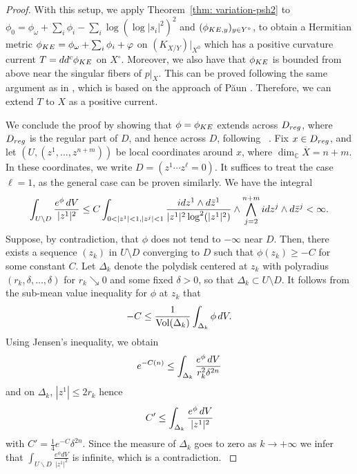 \documentclass[a4paper, 11pt]{amsart}
\theoremstyle{plain}
\numberwithin{equation}{section} %
\numberwithin{figure}{section} %
\theoremstyle{plain}
\theoremstyle{plain}
\theoremstyle{plain}
\theoremstyle{plain}
\theoremstyle{remark}
\theoremstyle{definition}
\theoremstyle{definition}
\DeclareMathOperator \Vol {{\rm Vol}}
\begin{document}
\begin{proof}
{With this setup, we apply Theorem~\ref{thm: variation-psh2}  to $\phi_0= \phi_\omega+\sum_i \phi_i  -\sum_i\log(\log|s_i|^2)^2$  and $(\phi_{{\rm KE}, y})_{y\in Y^\circ }$, to obtain a Hermitian metric $ \phi_{\rm KE}=\phi_\omega+\sum_i\phi_i+ \varphi$ on $(K_{X/Y})|_{X^0}$ which has a positive curvature current  $T=dd^c\phi_{\rm KE}$ on $X^\circ$. }
Moreover, we also have that $\phi_{{\rm KE}}$ is bounded from above near the singular fibers of $p|_X$.  This can be proved following the same argument as in \cite[Section 6]{Guenancia_2020}, which is based on the approach of P\u aun \cite[\S 3.3]{paun17-relative-nef}.  
 Therefore, we can extend $T$ to $X$ as a positive current. 
 
 {We conclude the proof by showing that $\phi = \phi_{\rm KE}$ extends across $D_{\rm reg}$, {where $D_{\rm reg}$ is the regular part of $D$}, and hence across $D$, following ~\cite[Lemma 3.7]{Berman-Guenancia14-logcanonical}. Fix $x \in D_{\rm reg}$, and let $(U, (z^1, \ldots, z^{n+m}))$ be local coordinates around $x$, where $\dim_{\mathbb{C}} \overline{X}=n+m$. In these coordinates, we write $D = (z^1 \cdots z^\ell = 0)$. It suffices to treat the case $\ell = 1$, as the general case can be proven similarly. We have the integral 
 \[\int_{U\backslash D}\frac{e^\phi \, {\rm d}V}{|z^1|^2} \leq C\int_{0<|z^1| < 1, |z^j|<1 }\frac{i{\rm d}z^1\wedge {\rm d}\bar z^1}{|z^1|^2\log^2 (|z^1|^2)}\wedge\bigwedge_{j=2}^{n+m} i{\rm d}
 z^j\wedge {\rm d}\Bar{z}^j< \infty.  \]  Suppose, by contradiction, that $\phi$ does not tend to $-\infty$ near $D$. Then, there exists a sequence $(z_k)$ in $U \setminus D$ converging to $D$ such that $\phi(z_k) \geq -C$ for some constant $C$. Let $\Delta_k$ denote the polydisk centered at $z_k$ with polyradius $(r_k, \delta, \ldots, \delta)$ for $r_k \searrow 0$ and some fixed $\delta > 0$, so that $\Delta_k \subset U \setminus D$. It follows from the sub-mean value inequality for $\phi$ at $z_k $ that 
\[ -C\leq \frac{1}{\Vol(\Delta_k)}\int_{\Delta_k}\phi\, {\rm d}V.\]
 Using Jensen's inequality, we obtain 
\[e^{-C(n)}\leq \int_{\Delta_k}\frac{e^\phi \,{\rm d}V}{r_k^2\delta^{2n}} \]
 and on $\Delta_k$, $|z^1|\leq 2r_k$ hence \[C'\leq\int_{\Delta_k}\frac{e^\phi \, {\rm d}V}{|z^1|^2}  \] with $C'=\frac{1}{4}e^{-C}\delta^{2n}$. Since the measure of $\Delta_k$ goes to zero as $k\to+\infty$ we infer that $\int_{U\backslash D}\frac{e^\phi dV}{|z^1|^2}$ is infinite, which is a contradiction.
 }
\end{proof}
\end{document}
